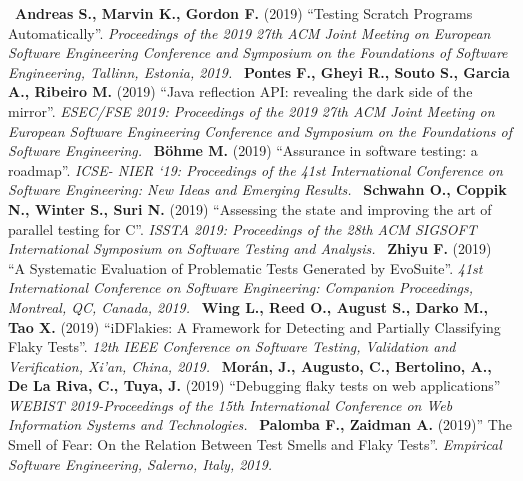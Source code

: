 \newline~\newline
[S23] \textbf{Andreas S., Marvin K., Gordon F.} (2019) “Testing Scratch Programs Automatically”. \emph{Proceedings of the 2019 27th ACM Joint Meeting on European Software Engineering Conference and Symposium on the Foundations of Software Engineering, Tallinn, Estonia, 2019.}
\newline~\newline
[S24] \textbf{Pontes F., Gheyi R., Souto S., Garcia A., Ribeiro M.} (2019) “Java reflection API: revealing the dark side of the mirror”. \emph{ESEC/FSE 2019: Proceedings of the 2019 27th ACM Joint Meeting on European Software Engineering Conference and Symposium on the Foundations of Software Engineering.}
\newline~\newline
[S25] \textbf{Böhme M.} (2019) “Assurance in software testing: a roadmap”. \emph{ICSE- NIER ‘19: Proceedings of the 41st International Conference on Software Engineering: New Ideas and Emerging Results.}
\newline~\newline
[S26] \textbf{Schwahn O., Coppik N., Winter S., Suri N.} (2019) “Assessing the state and improving the art of parallel testing for C”. \emph{ISSTA 2019: Proceedings of the 28th ACM SIGSOFT International Symposium on Software Testing and Analysis.}
\newline~\newline
[S27] \textbf{Zhiyu F.} (2019) “A Systematic Evaluation of Problematic Tests Generated by EvoSuite”. \emph{41st International Conference on Software Engineering: Companion Proceedings, Montreal, QC, Canada, 2019.}
\newline~\newline
[S28] \textbf{Wing L., Reed O., August S., Darko M., Tao X.} (2019) “iDFlakies: A Framework for Detecting and Partially Classifying Flaky Tests”. \emph{12th IEEE Conference on Software Testing, Validation and Verification, Xi’an, China, 2019.}
\newline~\newline
[S29] \textbf{Morán, J., Augusto, C., Bertolino, A., De La Riva, C., Tuya, J.}
(2019) “Debugging flaky tests on web applications” \emph{WEBIST 2019-Proceedings of the 15th International Conference on Web Information Systems and Technologies.}
\newline~\newline
[S30] \textbf{Palomba F., Zaidman A.} (2019)” The Smell of Fear: On the Relation Between Test Smells and Flaky Tests”. \emph{Empirical Software Engineering, Salerno, Italy, 2019.}